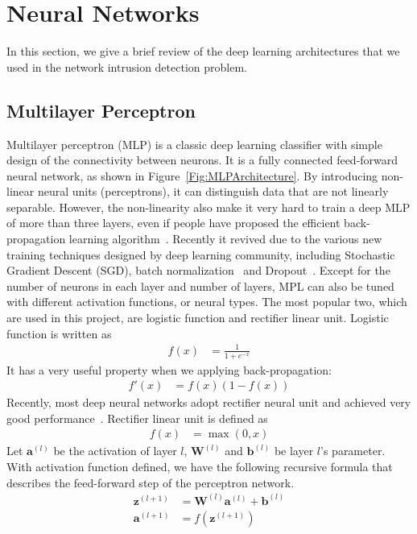 \section{Neural Networks}
\label{Sec:Architectures}
In this section, we give a brief review of the deep learning architectures that we used
in the network intrusion detection problem.

\subsection{Multilayer Perceptron}
Multilayer perceptron (MLP) is a classic deep learning classifier with simple
design of the connectivity between neurons.
It is a fully connected feed-forward neural network, as shown in Figure~\ref{Fig:MLPArchitecture}.
By introducing non-linear neural units (perceptrons), it can distinguish data that are
not linearly separable.
However, the non-linearity also make it very hard to train a deep MLP of more than three layers,
even if people have proposed the efficient back-propagation learning algorithm~\cite{Backpropagation}.
Recently it revived due to the various new training techniques designed by deep learning community,
including Stochastic Gradient Descent (SGD),
batch normalization~\cite{BatchNorm} and Dropout~\cite{Dropout}.
Except for the number of neurons in each layer and number of layers,
MPL can also be tuned with different activation functions, or neural types.
The most popular two, which are used in this project, are logistic function
and rectifier linear unit.
Logistic function is written as
\begin{align}
    f(x) &= \frac{1}{1 + e^{-x}}
\end{align}
It has a very useful property when we applying back-propagation:
\begin{align}
    f'(x) &= f(x) (1-f(x))
\end{align}
Recently, most deep neural networks adopt rectifier neural unit and
achieved very good performance~\cite{DeepLearning}.
Rectifier linear unit is defined as
\begin{align}
    f(x) &= \max(0, x)
\end{align}
Let $\mathbf{a}^{(l)}$ be the activation of layer $l$,
$\mathbf{W}^{(l)}$ and $\mathbf{b}^{(l)}$ be layer $l$'s parameter.
With activation function defined, we have the following recursive formula that describes
the feed-forward step of the perceptron network.
\begin{align}
    \mathbf{z}^{(l+1)} &= \mathbf{W}^{(l)} \mathbf{a}^{(l)} + \mathbf{b}^{(l)} \label{Equ:MLPFeedForward1}\\
    \mathbf{a}^{(l+1)} &= f(\mathbf{z}^{(l+1)})
    \label{Equ:MLPFeedForward2}
\end{align}

